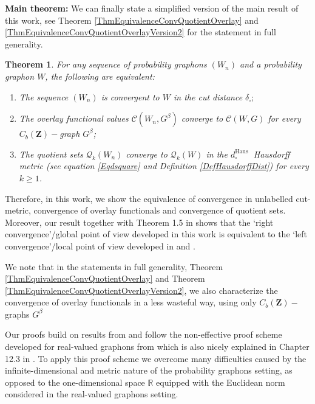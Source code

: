 \documentclass[11pt]{article}
\newtheorem{theorem}{Theorem}[section]
\def\R{\mathbb{R}}
\newcommand{\Space}{\mathbf{Z}}
\newcommand{\CbFunct}{C_b(\Space)}
\begin{document}
\textbf{Main theorem:
}
We can finally state a simplified version of the main result of this work, see Theorem \ref{ThmEquivalenceConvQuotientOverlay} and \ref{ThmEquivalenceConvQuotientOverlayVersion2} for the statement in full generality.

\begin{theorem}
For any sequence of probability graphons $\left(W_n\right)$ and a probability graphon $W$, the following are equivalent:
\begin{enumerate}

\item  The sequence $\left(W_n\right)$ is convergent to $W$ in the cut distance $\delta_{\square};$
\item The overlay functional values $\mathcal{C}\left(W_n, G^{\beta}\right)$ converge to $\mathcal{C}\left(W, G\right)$ for every $\CbFunct-$graph $G^{\beta}$;
\item The quotient sets $\mathcal{Q}_k\left(W_n\right)$ converge to $\mathcal{Q}_k\left(W\right)$ in the $d_{\square}^{\text {Haus }}$ Hausdorff metric (see  equation \eqref{Eqdsquare} and Definition \ref{DefHausdorffDist}) for every $k \geq 1$.
\end{enumerate}
\end{theorem}

Therefore, in this work, we show the equivalence of convergence in unlabelled cut-metric, convergence of overlay functionals and convergence of quotient sets. Moreover, our result together with Theorem 1.5 in \cite{abraham2023probabilitygraphons} shows that the `right convergence'/global point of view developed in this work is equivalent to the `left convergence'/local point of view developed in \cite{abraham2023probabilitygraphons} and \cite{lovász2010limits}.

We note that in the statements in full generality, Theorem \ref{ThmEquivalenceConvQuotientOverlay} and Theorem \ref{ThmEquivalenceConvQuotientOverlayVersion2}, we also characterize the convergence of overlay functionals in a less wasteful way, using only $\CbFunct-$graphs $G^{\beta}$    

Our proofs build on results from \cite{abraham2023probabilitygraphons} and follow the non-effective proof scheme developed for real-valued graphons from \cite{borgs2011convergentAnnals} which is also nicely explained in Chapter 12.3 in \cite{LovaszGraphLimits}. To apply this proof scheme we overcome many difficulties caused by the infinite-dimensional and metric nature of the probability graphons setting, as opposed to the one-dimensional space $\R$ equipped with the Euclidean norm considered in the real-valued graphons setting.
\newline
\end{document}
